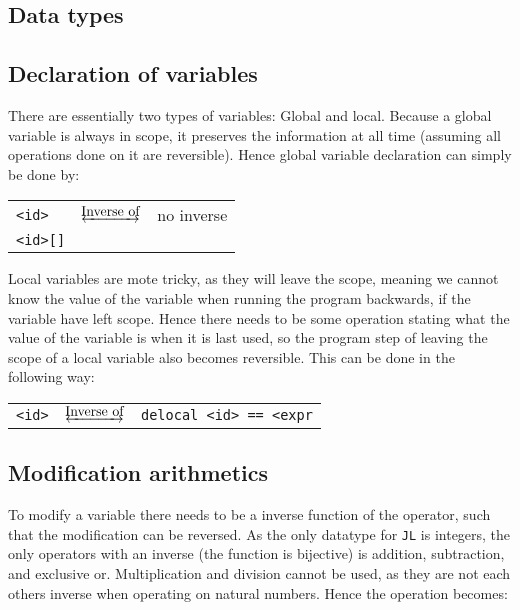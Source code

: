 \subsection{Data types}

\subsection{Declaration of variables}
There are essentially two types of variables: Global and local. Because a global variable is
always in scope, it preserves the information at all time (assuming all operations done on it
are reversible). Hence global variable declaration can simply be done by:

\begin{table*}[h]
    \centering
    \begin{tabular}{lcl}
        \texttt{<id>} & $\underleftrightarrow{\text{Inverse of}}$ & no inverse \\
        \texttt{<id>[]}
    \end{tabular}
\end{table*}
\noindent
Local variables are mote tricky, as they will leave the scope, meaning we cannot know the value
of the variable when running the program backwards, if the variable have left scope. Hence there
needs to be some operation stating what the value of the variable is when it is last used, so
the program step of leaving the scope of a local variable also becomes reversible. This can be
done in the following way:

\begin{table*}[h]
    \centering
    \begin{tabular}{lcl}
        \texttt{<id>} & $\underleftrightarrow{\text{Inverse of}}$ & \texttt{delocal <id> == <expr}
    \end{tabular}
\end{table*}

\subsection{Modification arithmetics}
To modify a variable there needs to be a inverse function of the operator, such that the
modification can be reversed. As the only datatype for \texttt{JL} is integers, the only operators
with an inverse (the function is bijective) is addition, subtraction, and exclusive or.
Multiplication and division cannot be used, as they are not each others inverse when operating on
natural numbers. Hence the operation becomes:

